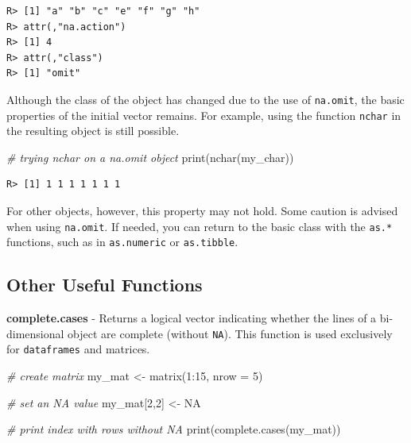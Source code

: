 \documentclass[
  12pt,
]{book}
\newenvironment{Shaded}{\begin{snugshade}}{\end{snugshade}}
\newcommand{\AttributeTok}[1]{\textcolor[rgb]{0.61,0.61,0.61}{#1}}
\newcommand{\CommentTok}[1]{\textcolor[rgb]{0.37,0.37,0.37}{\textit{#1}}}
\newcommand{\ConstantTok}[1]{\textcolor[rgb]{0,0,0}{#1}}
\newcommand{\DecValTok}[1]{\textcolor[rgb]{0.06,0.06,0.06}{#1}}
\newcommand{\FunctionTok}[1]{\textcolor[rgb]{0,0,0}{#1}}
\newcommand{\NormalTok}[1]{#1}
\newcommand{\OtherTok}[1]{\textcolor[rgb]{0.37,0.37,0.37}{#1}}
\newcommand{\SpecialCharTok}[1]{\textcolor[rgb]{0,0,0}{#1}}
\begin{document}
\begin{verbatim}
R> [1] "a" "b" "c" "e" "f" "g" "h"
R> attr(,"na.action")
R> [1] 4
R> attr(,"class")
R> [1] "omit"
\end{verbatim}

Although the class of the object has changed due to the use of \texttt{na.omit}, the basic properties of the initial vector remains. For example, using the function \texttt{nchar} in the resulting object is still possible.

\begin{Shaded}
\begin{Highlighting}[]
\CommentTok{\# trying nchar on a na.omit object}
\FunctionTok{print}\NormalTok{(}\FunctionTok{nchar}\NormalTok{(my\_char))}
\end{Highlighting}
\end{Shaded}

\begin{verbatim}
R> [1] 1 1 1 1 1 1 1
\end{verbatim}

For other objects, however, this property may not hold. Some caution is advised when using \texttt{na.omit}. If needed, you can return to the basic class with the \texttt{as.*} functions, such as in \texttt{as.numeric} or \texttt{as.tibble}.

\hypertarget{other-useful-functions-6}{%
\subsection{Other Useful Functions}\label{other-useful-functions-6}}

\textbf{complete.cases} - Returns a logical vector indicating whether the lines of a bi-dimensional object are complete (without \texttt{NA}). This function is used exclusively for \texttt{dataframes} and matrices. 

\begin{Shaded}
\begin{Highlighting}[]
\CommentTok{\# create matrix}
\NormalTok{my\_mat }\OtherTok{\textless{}{-}} \FunctionTok{matrix}\NormalTok{(}\DecValTok{1}\SpecialCharTok{:}\DecValTok{15}\NormalTok{, }\AttributeTok{nrow =} \DecValTok{5}\NormalTok{)}

\CommentTok{\# set an NA value}
\NormalTok{my\_mat[}\DecValTok{2}\NormalTok{,}\DecValTok{2}\NormalTok{] }\OtherTok{\textless{}{-}} \ConstantTok{NA}

\CommentTok{\# print index with rows without NA}
\FunctionTok{print}\NormalTok{(}\FunctionTok{complete.cases}\NormalTok{(my\_mat))}
\end{Highlighting}
\end{Shaded}
\end{document}
